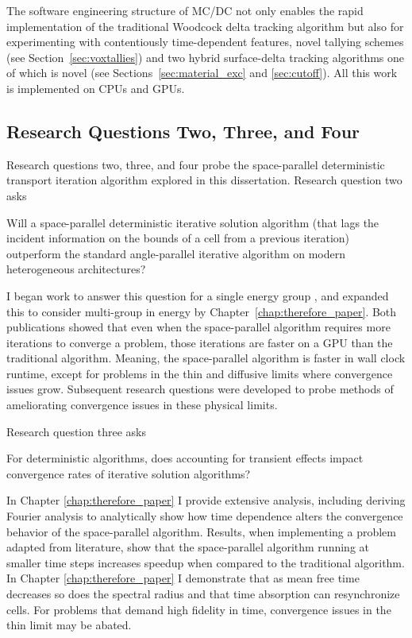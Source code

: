 The software engineering structure of MC/DC not only enables the rapid implementation of the traditional Woodcock delta tracking algorithm but also for experimenting with contentiously time-dependent features, novel tallying schemes (see Section~\ref{sec:voxtallies}) and two hybrid surface-delta tracking algorithms one of which is novel (see Sections~\ref{sec:material_exc} and \ref{sec:cutoff}).
All this work is implemented on CPUs and GPUs.

\subsection{Research Questions Two, Three, and Four}

Research questions two, three, and four probe the space-parallel deterministic transport iteration algorithm explored in this dissertation.
Research question two asks
\begin{displayquote}
Will a space-parallel deterministic iterative solution algorithm (that lags the incident information on the bounds of a cell from a previous iteration) outperform the standard angle-parallel iterative algorithm on modern heterogeneous architectures?
\end{displayquote}
I began work to answer this question for a single energy group \cite{morgan2023oci}, and expanded this to consider multi-group in energy by Chapter~\ref{chap:therefore_paper}.
Both publications showed that even when the space-parallel algorithm requires more iterations to converge a problem, those iterations are faster on a GPU than the traditional algorithm.
Meaning, the space-parallel algorithm is faster in wall clock runtime, except for problems in the thin and diffusive limits where convergence issues grow.
Subsequent research questions were developed to probe methods of ameliorating convergence issues in these physical limits.

Research question three asks
\begin{displayquote}
For deterministic algorithms, does accounting for transient effects impact convergence rates of iterative solution algorithms?
\end{displayquote}
In Chapter \ref{chap:therefore_paper} I provide extensive analysis, including deriving Fourier analysis to analytically show how time dependence alters the convergence behavior of the space-parallel algorithm.
Results, when implementing a problem adapted from literature, show that the space-parallel algorithm running at smaller time steps increases speedup when compared to the traditional algorithm.
In Chapter \ref{chap:therefore_paper} I demonstrate that as mean free time decreases so does the spectral radius and that time absorption can resynchronize cells.
For problems that demand high fidelity in time, convergence issues in the thin limit may be abated.

